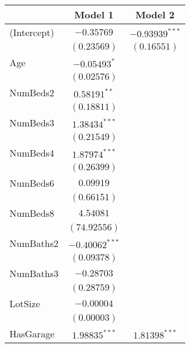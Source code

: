 
\begin{table}
\begin{center}
\begin{tabular}{l c c}
\hline
 & Model 1 & Model 2 \\
\hline
(Intercept)                    & $-0.35769$       & $-0.93939^{***}$ \\
                               & $(0.23569)$      & $(0.16551)$      \\
Age                            & $-0.05493^{*}$   &                  \\
                               & $(0.02576)$      &                  \\
NumBeds2                       & $0.58191^{**}$   &                  \\
                               & $(0.18811)$      &                  \\
NumBeds3                       & $1.38434^{***}$  &                  \\
                               & $(0.21549)$      &                  \\
NumBeds4                       & $1.87974^{***}$  &                  \\
                               & $(0.26399)$      &                  \\
NumBeds6                       & $0.09919$        &                  \\
                               & $(0.66151)$      &                  \\
NumBeds8                       & $4.54081$        &                  \\
                               & $(74.92556)$     &                  \\
NumBaths2                      & $-0.40062^{***}$ &                  \\
                               & $(0.09378)$      &                  \\
NumBaths3                      & $-0.28703$       &                  \\
                               & $(0.28759)$      &                  \\
LotSize                        & $-0.00004$       &                  \\
                               & $(0.00003)$      &                  \\
HasGarage                      & $1.98835^{***}$  & $1.81398^{***}$  \\

\end{tabular}
\end{center}
\end{table}
